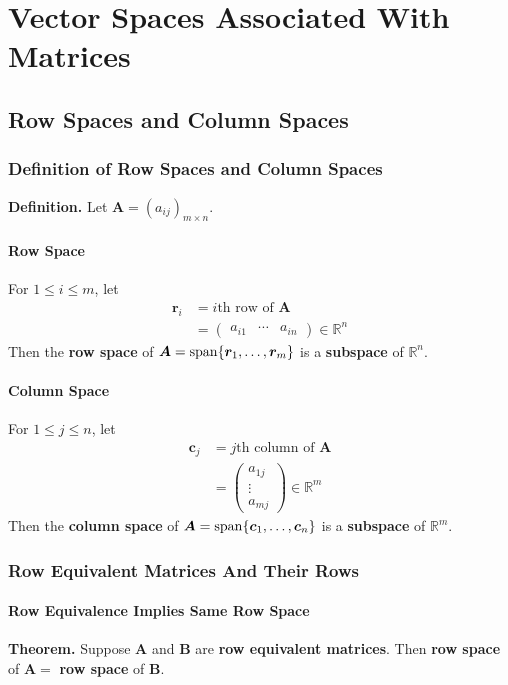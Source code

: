 \documentclass[../ma2001_notes.tex]{subfiles}
\begin{document}
\chapter{Vector Spaces Associated With Matrices}

\section{Row Spaces and Column Spaces}
\subsection{Definition of Row Spaces and Column Spaces}
\textbf{Definition.} Let \(\bm{A}=(a_{ij})_{m\times n}\).

\subsubsection{Row Space}
For \(1\leq i\leq m\), let
\begin{align*}
	\bm{r}_i
	&=i\text{th row of } \bm{A} \\
	&=\begin{pmatrix}
		a_{i1} & \cdots & a_{in}
	\end{pmatrix}\in\mathbb{R}^n
\end{align*}
Then the \textbf{row space} of \(\bm{A}=\operatorname{span}\{\bm{r}_1,\ldots,\bm{r}_m\}\) is a \textbf{subspace} of \(\mathbb{R}^n\).

\subsubsection{Column Space}
For \(1\leq j\leq n\), let
\begin{align*}
	\bm{c}_j
	&=j\text{th column of } \bm{A} \\
	&=\begin{pmatrix}
		a_{1j} \\ \vdots \\ a_{mj}
	\end{pmatrix}\in\mathbb{R}^m
\end{align*}
Then the \textbf{column space} of \(\bm{A}=\operatorname{span}\{\bm{c}_1,\ldots,\bm{c}_n\}\) is a \textbf{subspace} of \(\mathbb{R}^m\).

\subsection{Row Equivalent Matrices And Their Rows}
\subsubsection{Row Equivalence Implies Same Row Space}
\textbf{Theorem.} Suppose \(\bm{A}\) and \(\bm{B}\) are \textbf{row equivalent matrices}. Then \textbf{row space} of \(\bm{A}=\) \textbf{row space} of \(\bm{B}\).
\end{document}
